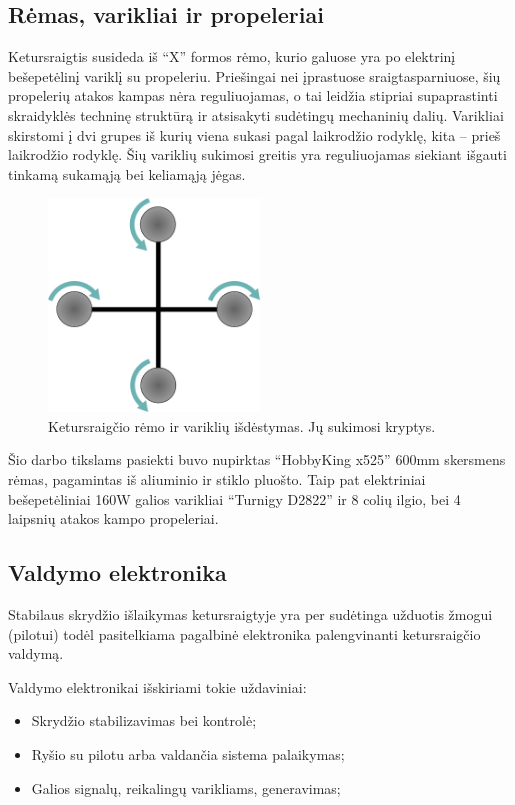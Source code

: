 \documentclass[12pt, a4paper, lithuanian, final]{article}
\begin{document}
\subsection{Rėmas, varikliai ir propeleriai}
Ketursraigtis susideda iš "`X"' formos rėmo, kurio galuose yra po elektrinį bešepetėlinį variklį su propeleriu.
Priešingai nei įprastuose sraigtasparniuose, šių propelerių atakos kampas nėra reguliuojamas, o tai leidžia stipriai supaprastinti skraidyklės techninę struktūrą ir atsisakyti sudėtingų mechaninių dalių.
Varikliai skirstomi į dvi grupes iš kurių viena sukasi pagal laikrodžio rodyklę, kita -- prieš laikrodžio rodyklę.
Šių variklių sukimosi greitis yra reguliuojamas siekiant išgauti tinkamą sukamąją bei keliamąją jėgas.

\begin{figure}[H]
\begin{center}
\includegraphics[width=0.5\textwidth]{img/rotor-direction.png}
\caption{Ketursraigčio rėmo ir variklių išdėstymas. Jų sukimosi kryptys.}
\end{center}
\end{figure}

Šio darbo tikslams pasiekti buvo nupirktas "`HobbyKing x525"' 600mm skersmens rėmas, pagamintas iš aliuminio ir stiklo pluošto.
Taip pat elektriniai bešepetėliniai 160W galios varikliai "`Turnigy D2822"' ir 8 colių ilgio, bei 4 laipsnių atakos kampo propeleriai.


\subsection{Valdymo elektronika}
Stabilaus skrydžio išlaikymas ketursraigtyje yra per sudėtinga užduotis žmogui (pilotui) todėl pasitelkiama pagalbinė elektronika palengvinanti ketursraigčio valdymą.

Valdymo elektronikai išskiriami tokie uždaviniai:
\begin{itemize}
	\item Skrydžio stabilizavimas bei kontrolė;
	\item Ryšio su pilotu arba valdančia sistema palaikymas;
	\item Galios signalų, reikalingų varikliams, generavimas;
\end{itemize}
\end{document}
